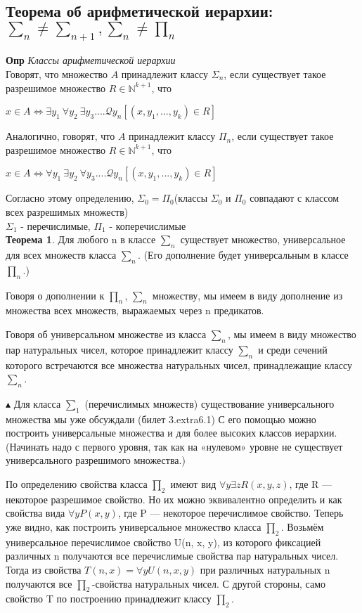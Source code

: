 \subsection{Теорема об арифметической иерархии: $\sum_n \neq \sum_{n+1}, \sum_n \neq \prod_n$}

\textbf{Опр} \textit{Классы арифметической иерархии}\\
Говорят, что множество $A $ принадлежит классу $\Sigma_n$, если существует такое разрешимое множество $R \in \mathbb{N}^{k+1}$, что \begin{center}
$x \in A \Longleftrightarrow \exists y_1 \ \forall y_2 \ \exists y_3 .... \mathcal{Q} y_n [(x, y_1,...,y_k) \in R]$
\\
\end{center}
Аналогично, говорят, что $A$ принадлежит классу $\Pi_n$, если существует такое разрешимое множество $R \in \mathbb{N}^{k+1}$, что \begin{center}
$x \in A \Longleftrightarrow \forall y_1 \ \exists y_2 \ \forall y_3 .... \mathcal{Q} y_n [(x, y_1,...,y_k) \in R]$
\end{center}

Согласно этому определению, $\Sigma_0 = \Pi_0$(классы $\Sigma_0$ и $\Pi_0$ совпадают с классом всех разрешимых множеств)
\\
$\Sigma_1$ - перечислимые, $\Pi_1$ - коперечислимые
\\

\textbf{Теорема 1}. Для любого n в классе $\sum_n$ существует множество,
универсальное для всех множеств класса $\sum_n$. (Его дополнение будет
универсальным в классе $\prod_n$.)

Говоря о дополнении к $\prod_n$, $\sum_n$  множеству, мы имеем в виду дополнение из множества всех множеств, выражаемых через n предикатов.

Говоря об универсальном множестве из класса $\sum_n$, мы имеем в виду множество пар натуральных чисел, которое принадлежит классу $\sum_n$ и среди сечений которого встречаются все множества натуральных чисел, принадлежащие классу $\sum_n$.

$\blacktriangle$
Для класса $\sum_1$ (перечислимых множеств) существование универсального множества мы уже обсуждали (билет 3.extra6.1) С его помощью можно построить универсальные множества и для более высоких классов иерархии. (Начинать надо с первого уровня, так как на «нулевом» уровне не существует универсального разрешимого множества.)

По определению свойства класса $\prod_2$ имеют вид $\forall y\exists z R(x, y, z)$,
где R — некоторое разрешимое свойство. Но их можно эквивалентно определить и как свойства вида $\forall y P(x, y)$, где P — некоторое перечислимое свойство. Теперь уже видно, как построить универсальное множество класса $\prod_2$. Возьмём универсальное перечислимое свойство U(n, x, y), из которого фиксацией различных n получаются все перечислимые свойства пар натуральных чисел. Тогда из свойства $T(n, x) = \forall y U(n, x, y)$ при различных натуральных n получаются все $\prod_2$-свойства натуральных чисел. С другой стороны, само свойство T по построению принадлежит классу $\prod_2$.

